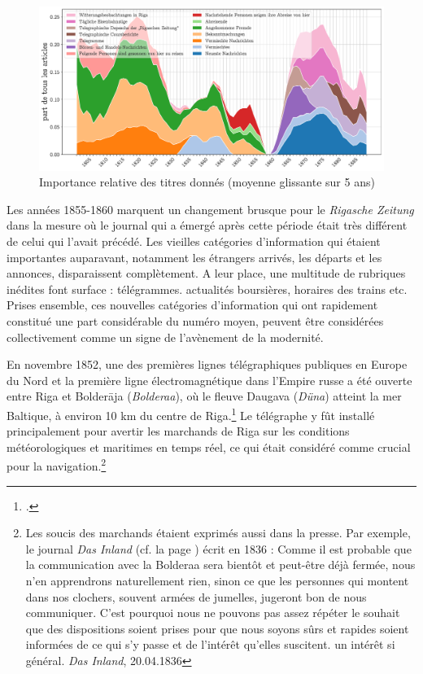 \documentclass[a4paper,twoside,12pt]{article}
\begin{document}
\begin{figure}[h]
\centering
\captionsetup{justification=centering}
\includegraphics[width=\textwidth]{images/headings_other.pdf}
\caption{Importance relative des titres donnés (moyenne glissante sur 5 ans)}
\label{fig:headings_other}
\end{figure}

Les années 1855-1860 marquent un changement brusque pour le \textit{Rigasche Zeitung} dans la mesure où le journal qui a émergé après cette période était très différent de celui qui l'avait précédé. Les vieilles catégories d'information qui étaient importantes auparavant, notamment les étrangers arrivés, les départs et les annonces, disparaissent complètement. A leur place, une multitude de rubriques inédites font surface : télégrammes. actualités boursières, horaires des trains etc. Prises ensemble, ces nouvelles catégories d'information qui ont rapidement constitué une part considérable du numéro moyen, peuvent être considérées collectivement comme un signe de l'avènement de la modernité.

En novembre 1852, une des premières lignes télégraphiques publiques en Europe du Nord et la première ligne électromagnétique dans l'Empire russe a été ouverte entre Riga et Bolderāja (\textit{Bolderaa}), où le fleuve Daugava (\textit{Düna}) atteint la mer Baltique, à environ 10 km du centre de Riga.\footcite[48-54]{petersone_rigas-bolderajas_1999} Le télégraphe y fût installé principalement pour avertir les marchands de Riga sur les conditions météorologiques et maritimes en temps réel, ce qui était considéré comme crucial pour la navigation.\footnote{Les soucis des marchands étaient exprimés aussi dans la presse. Par exemple, le journal \textit{Das Inland} (cf. la page \pageref{das_inland}) écrit en 1836 : \og Comme il est probable que la communication avec la Bolderaa sera bientôt et peut-être déjà fermée, nous n'en apprendrons naturellement rien, sinon ce que les personnes qui montent dans nos clochers, souvent armées de jumelles, jugeront bon de nous communiquer. C'est pourquoi nous ne pouvons pas assez répéter le souhait que des dispositions soient prises pour que nous soyons sûrs et rapides soient informées de ce qui s'y passe et de l'intérêt qu'elles suscitent. un intérêt si général. \fg{} \textit{Das Inland}, 20.04.1836} 
\end{document}
